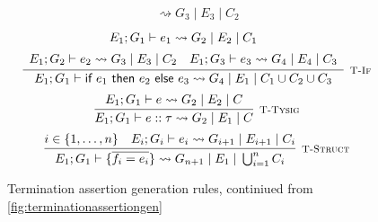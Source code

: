 \begin{figure}[]
\[{\begin{array}{c}
                    \rightsquigarrow G_3\; |\; E_3\; |\; C_2
            \end{array}
        }
    \]
    \vspace{0.5pt}
    \[
        \infer[\textsc{\footnotesize T-If}]{
            E_1; G_1 \vdash \textsf{if } e_1 \textsf{ then } e_2 \textsf{ else } e_3
                \rightsquigarrow G_4\; |\; E_1\; |\; C_1 \cup C_2 \cup C_3
        }{
            \begin{array}{c}
                E_1; G_1 \vdash e_1 \rightsquigarrow G_2\; |\; E_2\; |\; C_1 \\[5pt]
                E_1; G_2 \vdash e_2 \rightsquigarrow G_3\; |\; E_3\; |\; C_2
                \hspace{1em}
                E_1; G_3 \vdash e_3 \rightsquigarrow G_4\; |\; E_4\; |\; C_3
            \end{array}
        }
    \]
    \vspace{0.5pt}
    \[
        \infer[\textsc{\footnotesize T-Tysig}]{
            E_1; G_1 \vdash e :: \tau
                \rightsquigarrow G_2\; |\; E_1\; |\; C
        }{
            E_1; G_1 \vdash e \rightsquigarrow G_2\; |\; E_2\; |\; C
        }
    \]
    \vspace{0.5pt}
    \[
        \infer[\textsc{\footnotesize T-Struct}]{
            E_1; G_1 \vdash \{\overline{f_i = e_i}\}
                \rightsquigarrow G_{n+1}\; |\; E_1\; |\; \bigcup_{i = 1}^n C_i
        }{
            i \in \{1, \dots, n\}\quad  E_i; G_i \vdash e_i 
                \rightsquigarrow G_{i+1}\; |\; E_{i+1}\; |\; C_i
        }
    \]
    
    \caption{Termination assertion generation rules,
             continiued from \autoref{fig:terminationassertiongen}}
    \label{fig:terminationassertiongen2}
\end{figure}

